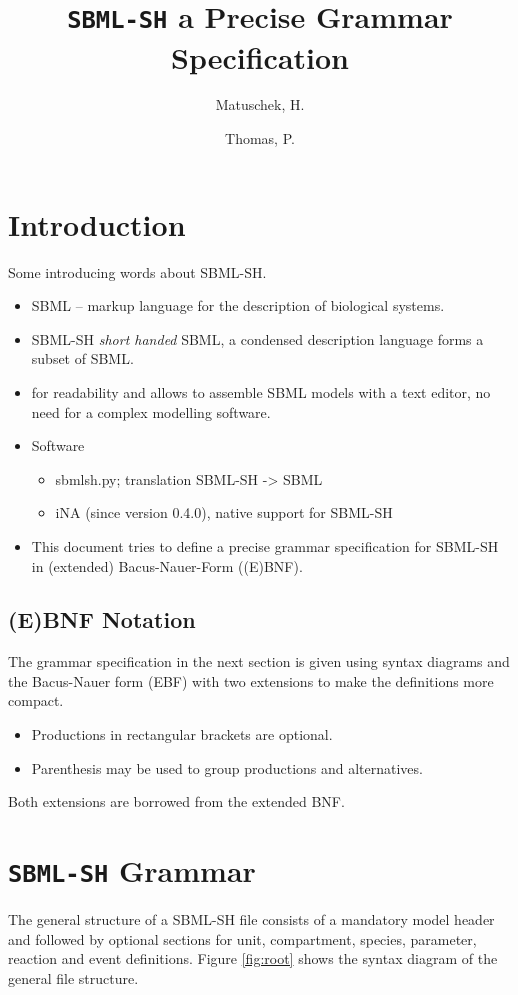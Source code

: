 \documentclass[a4paper]{article}
\title{\texttt{SBML-SH} a Precise Grammar Specification}
\author{Matuschek, H. \and Thomas, P.}
\begin{document}
\lstset{basicstyle=\small\ttfamily}

\maketitle

\section{Introduction}
Some introducing words about SBML-SH.
\begin{itemize}
\item SBML -- markup language for the description of biological systems. 
\item SBML-SH \emph{short handed} SBML, a condensed description language forms a subset of SBML. 
\item for readability and allows to assemble SBML models with a text editor, no need for a complex modelling software.
\item Software 
\begin{itemize}
\item sbmlsh.py; translation SBML-SH -> SBML
\item iNA (since version 0.4.0), native support for SBML-SH
\end{itemize}
\item This document tries to define a precise grammar specification for SBML-SH in (extended) Bacus-Nauer-Form ((E)BNF).
\end{itemize}

\subsection{(E)BNF Notation}
The grammar specification in the next section is given using syntax diagrams and the Bacus-Nauer form (EBF) with two extensions to make the definitions more compact.

\begin{itemize}
  \item Productions in rectangular brackets are optional.
  \item Parenthesis may be used to group productions and alternatives.
\end{itemize}

Both extensions are borrowed from the extended BNF.


\section{\texttt{SBML-SH} Grammar}
The general structure of a SBML-SH file consists of a mandatory model header and followed by optional sections for unit, compartment, species, parameter, reaction and event definitions. Figure \ref{fig:root} shows the syntax diagram of the general file structure.
\end{document}
